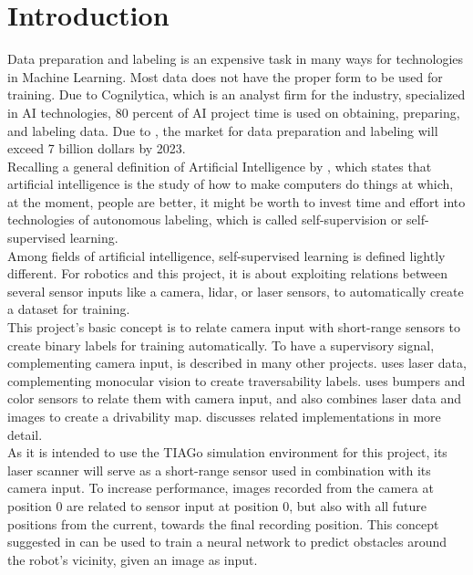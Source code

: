 \section{Introduction \label{Introduction} }
Data preparation and labeling is an expensive task in many
ways for technologies in Machine Learning. Most data does not have the proper form to be used for training. Due to Cognilytica, which is an analyst firm for the industry, specialized in AI technologies, 80 percent of AI project time is used on obtaining, preparing, and labeling data. Due to \cite{cognilytica}, the market for data preparation and labeling will exceed 7 billion dollars by 2023.\\

Recalling a general definition of Artificial Intelligence by \cite{rich1983artificial}, which states that artificial intelligence is the study of how to make computers do things at which, at the moment, people are better, it might be worth to invest time and effort into technologies of autonomous labeling, which is called self-supervision or self-supervised learning.\\

Among fields of artificial intelligence, self-supervised learning is defined lightly different. For robotics and this project, it is about exploiting relations between several sensor inputs like a camera, lidar, or laser sensors, to automatically create a dataset for training.\\

This project's basic concept is to relate camera input with short-range sensors to create binary labels for training automatically. To have a supervisory signal, complementing camera input, is described in many other projects. \cite{5979661} uses laser data, complementing monocular vision to create traversability labels. \cite{nava2019learning} uses bumpers and color sensors to relate them with camera input, and \cite{Dahlkamp-RSS-06} also combines laser data and images to create a drivability map.  discusses related implementations in more detail.\\

As it is intended to use the TIAGo simulation environment for this project, its laser scanner will serve as a short-range sensor used in combination with its camera input. To increase performance, images recorded from the camera at position $0$ are related to sensor input at position $0$, but also with all future positions from the current, towards the final recording position. This concept suggested in \cite{nava2019learning} can be used to train a neural network to predict obstacles around the robot's vicinity, given an image as input.\\

